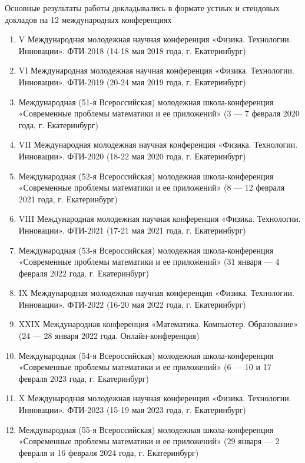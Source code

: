 {\probation}
Основные результаты работы докладывались в формате устных и стендовых докладов на 12 международных конференциях
\begin{enumerate}
    \item V Международная молодежная научная конференция «Физика. Технологии. Инновации». ФТИ-2018 (14-18 мая 2018 года, г. Екатеринбург)
    \item VI Международная молодежная научная конференция «Физика. Технологии. Инновации». ФТИ-2019 (20-24 мая 2019 года, г. Екатеринбург)
    \item Международная (51-я Всероссийская) молодежная школа-конференция «Современные проблемы математики и ее приложений» (3 — 7 февраля 2020 года, г. Екатеринбург)
    \item VII Международная молодежная научная конференция «Физика. Технологии. Инновации». ФТИ-2020 (18-22 мая 2020 года, г. Екатеринбург)
    \item Международная (52-я Всероссийская) молодежная школа-конференция «Современные проблемы математики и ее приложений» (8 — 12 февраля 2021 года, г. Екатеринбург)
    \item VIII Международная молодежная научная конференция «Физика. Технологии. Инновации». ФТИ-2021 (17-21 мая 2021 года, г. Екатеринбург)
    \item Международная (53-я Всероссийская) молодежная школа-конференция «Современные проблемы математики и ее приложений» (31 января — 4 февраля 2022 года, г. Екатеринбург)
    \item IX Международная молодежная научная конференция «Физика. Технологии. Инновации». ФТИ-2022 (16-20 мая 2022 года, г. Екатеринбург)
    \item XXIX Международная конференция «Математика. Компьютер. Образование» (24 — 28 января 2022 года. Онлайн-конференция)
    \item Международная (54-я Всероссийская) молодежная школа-конференция «Современные проблемы математики и ее приложений» (6 — 10 и 17 февраля 2023 года, г. Екатеринбург)
    \item X Международная молодежная научная конференция «Физика. Технологии. Инновации». ФТИ-2023 (15-19 мая 2023 года, г. Екатеринбург)
    \item Международная (55-я Всероссийская) молодежная школа-конференция «Современные проблемы математики и ее приложений» (29 января — 2 февраля и 16 февраля 2024 года, г. Екатеринбург)
\end{enumerate} 


